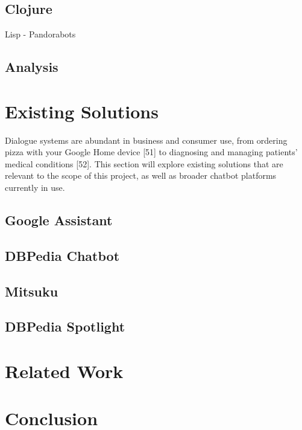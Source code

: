 \subsection{Clojure}
Lisp - Pandorabots

\subsection{Analysis}

\cleardoublepage
\section{Existing Solutions}
Dialogue systems are abundant in business and consumer use, from ordering pizza with your Google Home device [51] to diagnosing and managing patients’ medical conditions [52]. This section will explore existing solutions that are relevant to the scope of this project, as well as broader chatbot platforms currently in use.

\subsection{Google Assistant}
\subsection{DBPedia Chatbot}
\subsection{Mitsuku}
\label{subsec:Mitsuku}

\subsection{DBPedia Spotlight}

\section{Related Work}

\section{Conclusion}





